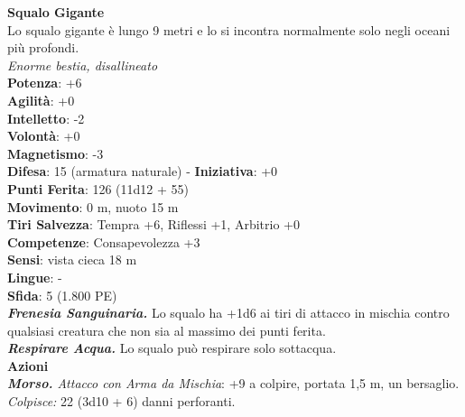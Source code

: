 \begin{multicols}{2}
\medskip\textbf{Squalo Gigante}\\
Lo squalo gigante è lungo 9 metri e lo si incontra normalmente solo negli oceani più profondi.\\
\emph{Enorme bestia, disallineato}\\
\textbf{Potenza}: +6\\
\textbf{Agilità}: +0\\
\textbf{Intelletto}: -2\\
\textbf{Volontà}: +0\\
\textbf{Magnetismo}: -3\\
\textbf{Difesa}: 15 (armatura naturale) - \textbf{Iniziativa}: +0\\
\textbf{Punti Ferita}: 126 (11d12 + 55)\\
\textbf{Movimento}: 0 m, nuoto 15 m\\
\textbf{Tiri Salvezza}: Tempra +6, Riflessi +1, Arbitrio +0\\
\textbf{Competenze}: Consapevolezza +3\\
\textbf{Sensi}: vista cieca 18 m\\
\textbf{Lingue}: -\\
\textbf{Sfida}: 5 (1.800 PE)\smallskip\\
\emph{\textbf{Frenesia Sanguinaria.}} Lo squalo ha +1d6 ai tiri di attacco in mischia contro qualsiasi creatura che non sia al massimo dei punti ferita.\\
\emph{\textbf{Respirare Acqua.}} Lo squalo può respirare solo sottacqua.\\
\smallskip\textbf{Azioni}\\
\emph{\textbf{Morso.} Attacco con Arma da Mischia}: +9 a colpire, portata 1,5 m, un bersaglio.\\
\emph{Colpisce:} 22 (3d10 + 6) danni perforanti.\\



\end{multicols}
